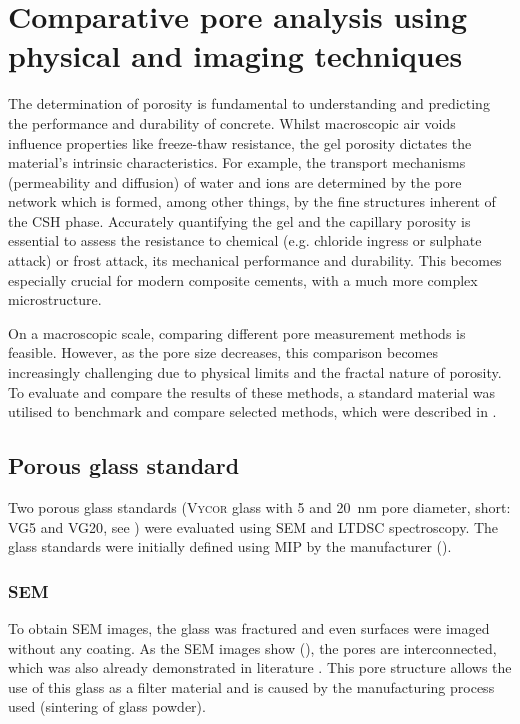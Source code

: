 \chapter{Comparative pore analysis using physical and imaging techniques}

The determination of porosity is fundamental to understanding and predicting the performance and durability of concrete.
Whilst macroscopic air voids influence properties like freeze-thaw resistance, the gel porosity dictates the material's intrinsic characteristics.
For example, the transport mechanisms (permeability and diffusion) of water and ions are determined by the pore network which is formed, among other things, by the fine structures inherent of the \ac{CSH} phase.
Accurately quantifying the gel and the capillary porosity is essential to assess the resistance to chemical (e.g. chloride ingress or sulphate attack) or frost attack, its mechanical performance and durability.
This becomes especially crucial for modern composite cements, with a much more complex microstructure.

On a macroscopic scale, comparing different pore measurement methods is feasible.
However, as the pore size decreases, this comparison becomes increasingly challenging due to physical limits and the fractal nature of porosity.
To evaluate and compare the results of these methods, a standard material was utilised to benchmark and compare selected methods, which were described in .

\section{Porous glass standard}

Two porous glass standards (\textsc{Vycor} glass with \num{5} and \qty{20}{\nano\meter} pore diameter, short: \acs{VG5} and \acs{VG20}, see ) were evaluated using \ac{SEM} and \ac{LTDSC} spectroscopy.
The glass standards were initially defined using \ac{MIP} by the manufacturer (). %

\subsection{\acs*{SEM}}

To obtain \ac{SEM} images, the glass was fractured and even surfaces were imaged without any coating.
As the \ac{SEM} images show (), the pores are interconnected, which was also already demonstrated in literature \cite{levitz.1998, levitz.2007}.
This pore structure allows the use of this glass as a filter material and is caused by the manufacturing process used (sintering of glass powder).

